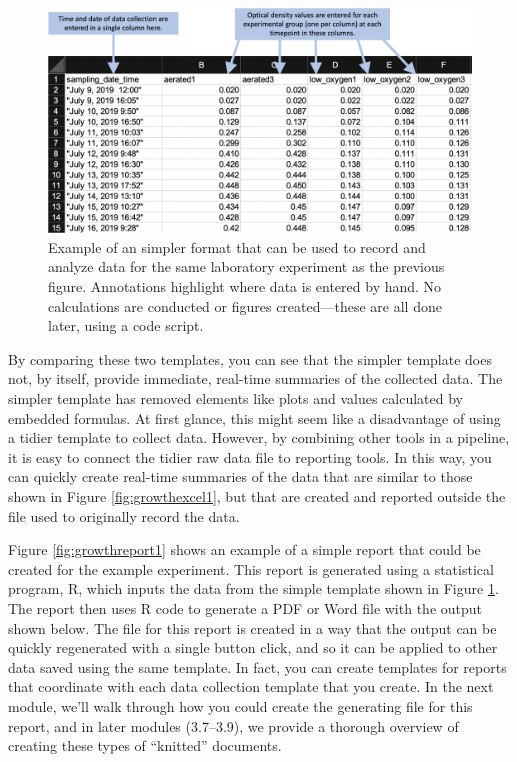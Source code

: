 \documentclass[]{tufte-book}
\begin{document}
\begin{figure}
\includegraphics[width=\textwidth]{figures/growth_curve_simple} \caption[Example of an simpler format that can be used to record and analyze data for the same laboratory experiment as the previous figure]{Example of an simpler format that can be used to record and analyze data for the same laboratory experiment as the previous figure. Annotations highlight where data is entered by hand. No calculations are conducted or figures created---these are all done later, using a code script.}\label{fig:growthsimple1}
\end{figure}

By comparing these two templates, you can see that the simpler template does
not, by itself, provide immediate, real-time summaries of the collected data. The
simpler template has removed elements like plots and values calculated by embedded
formulas. At first glance, this might seem like a disadvantage of using a tidier
template to collect data. However, by combining other tools in a pipeline, it is
easy to connect the tidier raw data file to reporting tools. In this way, you can
quickly create real-time summaries of the data that are similar to those shown in
Figure \ref{fig:growthexcel1}, but that are created and reported outside the file
used to originally record the data.

Figure \ref{fig:growthreport1} shows an example of a simple report that could
be created for the example experiment. This report is generated using a
statistical program, R, which inputs the data from the simple template shown in
Figure \ref{fig:growthsimple1}. The report then uses R code to generate a PDF
or Word file with the output shown below. The file for this report is created in
a way that the output can be quickly regenerated with a single button click, and
so it can be applied to other data saved using the same template. In fact, you can
create templates for reports that coordinate with each data collection template
that you create. In the next module, we'll walk through how you could create
the generating file for this report, and in later modules (3.7--3.9), we provide
a thorough overview of creating these types of ``knitted'' documents.
\end{document}

